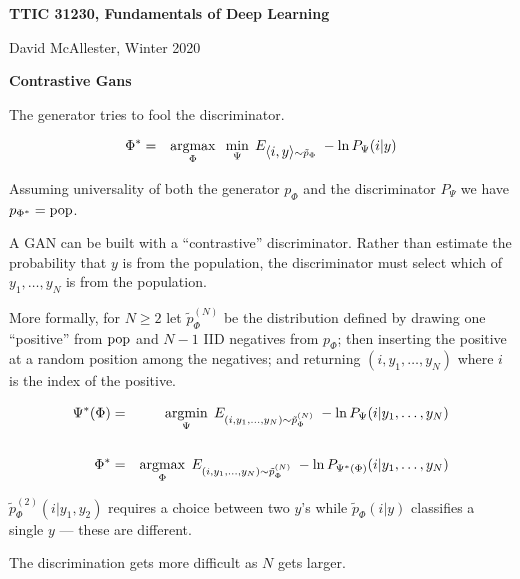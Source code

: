 





{\Huge

  \centerline{\bf TTIC 31230, Fundamentals of Deep Learning}
  \bigskip
  \centerline{David McAllester, Winter 2020}
  \vfill
  \centerline{\bf Contrastive Gans}
\vfill
\vfill


The generator tries to fool the discriminator.

\vfill
\begin{eqnarray*}
\Phi^* & = & \operatorname*{argmax}_\Phi\;\;\min_\Psi\;E_{{\mbox{$\langle i,y\rangle$}} \sim \tilde{p}_\Phi}\;-\ln P_\Psi(i|y)
\end{eqnarray*}

\vfill
Assuming universality of both the generator $p_\Phi$ and the discriminator $P_\Psi$ we have {\color{red} $p_{\Phi^*} = \mathrm{pop}$}.



A GAN can be built with a ``contrastive'' discriminator.  Rather than estimate the probability that $y$ is from the population, the discriminator must select which
of $y_1,\ldots,y_N$ is from the population.

\vfill
More formally, for $N \geq 2$ let {\color{red} $\tilde{p}_\Phi^{(N)}$} be the distribution defined by drawing one ``positive'' from $\mathrm{pop}$ and $N-1$ IID negatives from $p_\Phi$;
then inserting the positive at a random position among the negatives; and returning $(i,y_1,\ldots,y_N)$ where
$i$ is the index of the positive.


\begin{eqnarray*}
\Psi^*(\Phi) & = & \operatorname*{argmin}_\Psi\; E_{(i,y_1,\ldots,y_{N})\sim \tilde{p}_\Phi^{(N)}} \;- \ln P_\Psi(i|y_1,\ldots,y_{N}) \\
\\
\Phi^* & = & \operatorname*{argmax}_\Phi\; E_{(i,y_1,\ldots,y_{N})\sim \tilde{p}_\Phi^{(N)}} \;- \ln P_{\Psi^*(\Phi)}(i|y_1,\ldots,y_{N})
\end{eqnarray*}

\vfill
{\color{red} $\tilde{p}_\Phi^{(2)}(i|y_1,y_2)$} requires a choice between two $y$'s while {\color{red} $\tilde{p}_\Phi(i|y)$} classifies a single $y$ --- these are different.

\vfill
The discrimination gets more difficult as $N$ gets larger.


}
